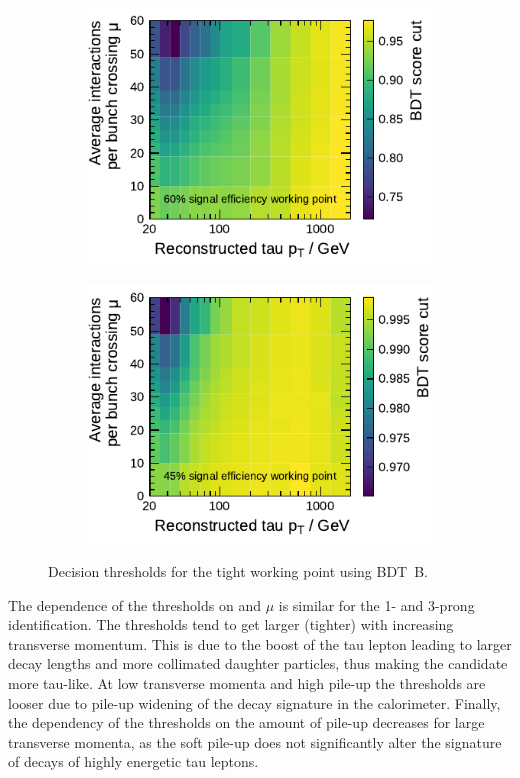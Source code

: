 \begin{figure}[htb]
  \centering
  \begin{subfigure}[t]{0.48\textwidth}
    \centering
    \includegraphics{./figures/bdt_perf/working_points/grid_1p_subsampling0269_wp.pdf}
  \end{subfigure}\hfill
  \begin{subfigure}[t]{0.48\textwidth}
    \centering
    \includegraphics{./figures/bdt_perf/working_points/grid_3p0327_wp.pdf}
  \end{subfigure}
  \caption[Decision thresholds of the tight working point for the optimised
  BDT]{Decision thresholds for the tight working point using \mbox{BDT B}.}
  \label{fig:working_point_cutmap}
\end{figure}

The dependence of the thresholds on \tauhadvis \pt and $\mu$ is similar for the
1- and 3-prong identification. The thresholds tend to get larger (tighter) with
increasing transverse momentum. This is due to the boost of the tau lepton
leading to larger decay lengths and more collimated daughter particles, thus
making the \tauhadvis candidate more tau-like. At low transverse momenta and
high pile-up the thresholds are looser due to pile-up widening of the decay
signature in the calorimeter. Finally, the dependency of the thresholds on the
amount of pile-up decreases for large transverse momenta, as the soft pile-up
does not significantly alter the signature of decays of highly energetic tau
leptons.

